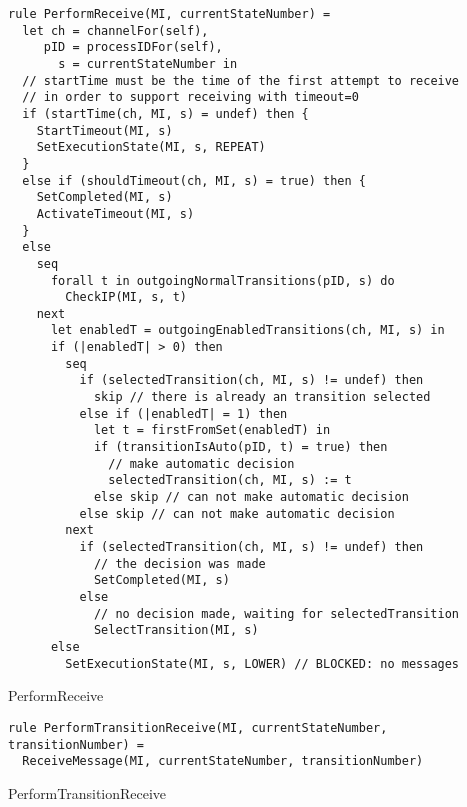\begin{listing}[H]
\begin{verbatim}
rule PerformReceive(MI, currentStateNumber) =
  let ch = channelFor(self),
     pID = processIDFor(self),
       s = currentStateNumber in
  // startTime must be the time of the first attempt to receive
  // in order to support receiving with timeout=0
  if (startTime(ch, MI, s) = undef) then {
    StartTimeout(MI, s)
    SetExecutionState(MI, s, REPEAT)
  }
  else if (shouldTimeout(ch, MI, s) = true) then {
    SetCompleted(MI, s)
    ActivateTimeout(MI, s)
  }
  else
    seq
      forall t in outgoingNormalTransitions(pID, s) do
        CheckIP(MI, s, t)
    next
      let enabledT = outgoingEnabledTransitions(ch, MI, s) in
      if (|enabledT| > 0) then
        seq
          if (selectedTransition(ch, MI, s) != undef) then
            skip // there is already an transition selected
          else if (|enabledT| = 1) then
            let t = firstFromSet(enabledT) in
            if (transitionIsAuto(pID, t) = true) then
              // make automatic decision
              selectedTransition(ch, MI, s) := t
            else skip // can not make automatic decision
          else skip // can not make automatic decision
        next
          if (selectedTransition(ch, MI, s) != undef) then
            // the decision was made
            SetCompleted(MI, s)
          else
            // no decision made, waiting for selectedTransition
            SelectTransition(MI, s)
      else
        SetExecutionState(MI, s, LOWER) // BLOCKED: no messages
\end{verbatim}
\caption{PerformReceive}
\label{lst:asm:PerformReceive}
\end{listing}



\begin{listing}[H]
\begin{verbatim}
rule PerformTransitionReceive(MI, currentStateNumber, transitionNumber) =
  ReceiveMessage(MI, currentStateNumber, transitionNumber)
\end{verbatim}
\caption{PerformTransitionReceive}
\label{lst:asm:PerformTransitionReceive}
\end{listing}




